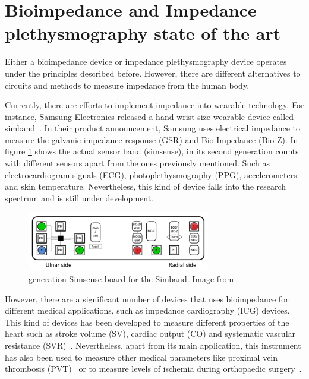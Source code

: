 \section{Bioimpedance and Impedance plethysmography state of the art} %
\label{section impedance 5}
Either a bioimpedance device or impedance plethysmography device operates under the principles described before. However, there are different alternatives to circuits and methods to measure impedance from the human body.  

Currently, there are efforts to implement impedance into wearable technology. For instance, Samsung Electronics released a hand-wrist size wearable device called simband~\cite{simsense}. In their product announcement, Samsung uses electrical impedance to measure the galvanic impedance response (GSR) and Bio-Impedance (Bio-Z). In figure \ref{fig:simsense} shows the actual sensor band (simsense), in its second generation counts with different sensors apart from the ones previously mentioned. Such as electrocardiogram signals (ECG), photoplethysmography (PPG),  accelerometers and skin temperature. Nevertheless, this kind of device falls into the research spectrum and is still under development.

\begin{figure}[!htpb]
	\centering
	\includegraphics[width=8cm,keepaspectratio]{figure10}    
	\caption[ generation Simsense board for the Simband]{ generation Simsense board for the Simband. Image from \cite{simsense}}
	\label{fig:simsense}
\end{figure}

However, there are a significant number of devices that uses bioimpedance for different medical applications, such as impedance cardiography (ICG) devices. This kind of devices has been developed to measure different properties of the heart such as stroke volume (SV), cardiac output (CO) and systematic vascular resistance (SVR)~\cite{neath2005utility}.  Nevertheless, apart from its main application, this instrument has also been used to measure other medical parameters like proximal vein thrombosis (PVT)~\cite{hull1978impedance} or to measure levels of ischemia during orthopaedic surgery~\cite{distefano1973bioelectrical}.

